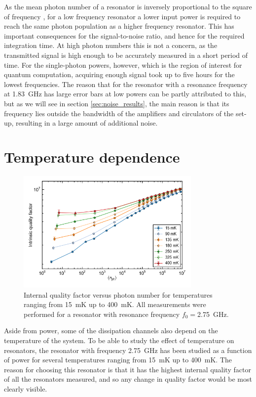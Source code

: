 As the mean photon number of a resonator is inversely proportional to the square of frequency \cite{bruno2015reducing}, for a low frequency resonator a lower input power is required to reach the same photon population as a higher frequency resonator. This has important consequences for the signal-to-noise ratio, and hence for the required integration time. At high photon numbers this is not a concern, as the transmitted signal is high enough to be accurately measured in a short period of time. For the single-photon powers, however, which is the region of interest for quantum computation, acquiring enough signal took up to five hours for the lowest frequencies. The reason that for the resonator with a resonance frequency at \SI{1.83}{\giga \hertz} has large error bars at low powers can be partly attributed to this, but as we will see in section \ref{sec:noise_results}, the main reason is that its frequency lies outside the bandwidth of the amplifiers and circulators of the set-up, resulting in a large amount of additional noise.

\section{Temperature dependence}
\label{sec:resonator:results:emperature_dependence}
\begin{figure}
    \centering
    \includegraphics[width=0.8\textwidth]{Figures/DRIE/Qi_vs_n_photon_temperature_dependence.png}
    \caption{Internal quality factor versus photon number for temperatures ranging from \SI{15}{\milli \kelvin} up to \SI{400}{\milli \kelvin}. All measurements were performed for a resonator with resonance frequency $f_0 = $\SI{2.75}{\giga \hertz}.}
    \label{fig:Qi_vs_n_photon_temperature_dependence}
\end{figure}

Aside from power, some of the dissipation channels also depend on the temperature of the system. To be able to study the effect of temperature on resonators, the resonator with frequency \SI{2.75}{\giga \hertz} has been studied as a function of power for several temperatures ranging from \SI{15}{\milli \kelvin} up to \SI{400}{\milli \kelvin}. The reason for choosing this resonator is that it has the highest internal quality factor of all the resonators measured, and so any change in quality factor would be most clearly visible.

